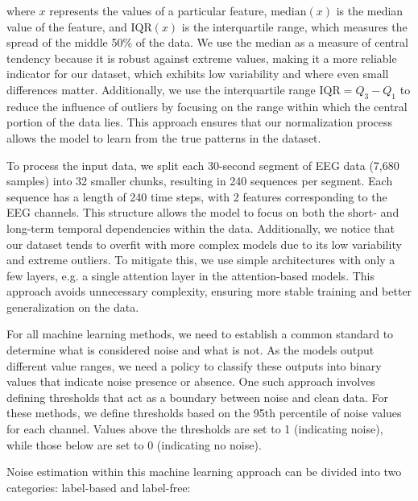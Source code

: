 where $x$ represents the values of a particular feature, $\text{median}(x)$ is the median value of the feature, and $\text{IQR}(x)$ is the interquartile range, which measures the spread of the middle 50\% of the data. We use the median as a measure of central tendency because it is robust against extreme values, making it a more reliable indicator for our dataset, which exhibits low variability and where even small differences matter. Additionally, we use the interquartile range $\text{IQR} = Q_3 - Q_1$ to reduce the influence of outliers by focusing on the range within which the central portion of the data lies. This approach ensures that our normalization process allows the model to learn from the true patterns in the dataset.

To process the input data, we split each 30-second segment of EEG data (7,680 samples) into 32 smaller chunks, resulting in 240 sequences per segment. Each sequence has a length of 240 time steps, with 2 features corresponding to the EEG channels. This structure allows the model to focus on both the short- and long-term temporal dependencies within the data. Additionally, we notice that our dataset tends to overfit with more complex models due to its low variability and extreme outliers. To mitigate this, we use simple architectures with only a few layers, e.g. a single attention layer in the attention-based models. This approach avoids unnecessary complexity, ensuring more stable training and better generalization on the data.

For all machine learning methods, we need to establish a common standard to determine what is considered noise and what is not. As the models output different value ranges, we need a policy to classify these outputs into binary values that indicate noise presence or absence. One such approach involves defining thresholds that act as a boundary between noise and clean data. For these methods, we define thresholds based on the 95th percentile of noise values for each channel. Values above the thresholds are set to 1 (indicating noise), while those below are set to 0 (indicating no noise).

Noise estimation within this machine learning approach can be divided into two categories: label-based and label-free:

